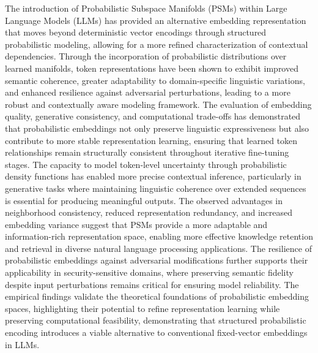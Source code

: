 \documentclass{article}
\begin{document}
The introduction of Probabilistic Subspace Manifolds (PSMs) within Large Language Models (LLMs) has provided an alternative embedding representation that moves beyond deterministic vector encodings through structured probabilistic modeling, allowing for a more refined characterization of contextual dependencies. Through the incorporation of probabilistic distributions over learned manifolds, token representations have been shown to exhibit improved semantic coherence, greater adaptability to domain-specific linguistic variations, and enhanced resilience against adversarial perturbations, leading to a more robust and contextually aware modeling framework. The evaluation of embedding quality, generative consistency, and computational trade-offs has demonstrated that probabilistic embeddings not only preserve linguistic expressiveness but also contribute to more stable representation learning, ensuring that learned token relationships remain structurally consistent throughout iterative fine-tuning stages. The capacity to model token-level uncertainty through probabilistic density functions has enabled more precise contextual inference, particularly in generative tasks where maintaining linguistic coherence over extended sequences is essential for producing meaningful outputs. The observed advantages in neighborhood consistency, reduced representation redundancy, and increased embedding variance suggest that PSMs provide a more adaptable and information-rich representation space, enabling more effective knowledge retention and retrieval in diverse natural language processing applications. The resilience of probabilistic embeddings against adversarial modifications further supports their applicability in security-sensitive domains, where preserving semantic fidelity despite input perturbations remains critical for ensuring model reliability. The empirical findings validate the theoretical foundations of probabilistic embedding spaces, highlighting their potential to refine representation learning while preserving computational feasibility, demonstrating that structured probabilistic encoding introduces a viable alternative to conventional fixed-vector embeddings in LLMs.




\end{document}

